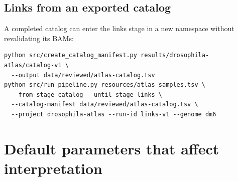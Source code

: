 \documentclass[11pt]{article}
\begin{document}
\subsection{Links from an exported catalog}

A completed catalog can enter the links stage in a new namespace without
revalidating its BAMs:

\begin{lstlisting}
python src/create_catalog_manifest.py results/drosophila-atlas/catalog-v1 \
  --output data/reviewed/atlas-catalog.tsv
python src/run_pipeline.py resources/atlas_samples.tsv \
  --from-stage catalog --until-stage links \
  --catalog-manifest data/reviewed/atlas-catalog.tsv \
  --project drosophila-atlas --run-id links-v1 --genome dm6
\end{lstlisting}

\section{Default parameters that affect interpretation}
\end{document}
